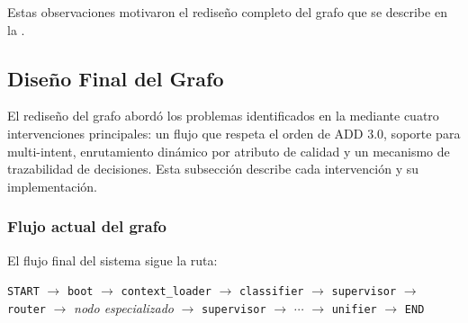 \documentclass[12pt, letterpaper, oneside]{article}
\begin{document}
Estas observaciones motivaron el rediseño completo del grafo que se describe en
la .


\subsection{Diseño Final del Grafo}
\label{subsec:grafo-final}


El rediseño del grafo abordó los problemas identificados en la
 mediante cuatro intervenciones principales: un flujo
que respeta el orden de ADD 3.0, soporte para multi-intent, enrutamiento dinámico
por atributo de calidad y un mecanismo de trazabilidad de decisiones. Esta
subsección describe cada intervención y su implementación.

\subsubsection{Flujo actual del grafo}
\label{sssec:flujo-actual}

El flujo final del sistema sigue la ruta:

\begin{center}
\texttt{START} $\rightarrow$ \texttt{boot} $\rightarrow$
\texttt{context\_loader} $\rightarrow$ \texttt{classifier}
$\rightarrow$ \texttt{supervisor} $\rightarrow$ \texttt{router}
$\rightarrow$ \emph{nodo especializado} $\rightarrow$
\texttt{supervisor} $\rightarrow$ $\cdots$ $\rightarrow$
\texttt{unifier} $\rightarrow$ \texttt{END}
\end{center}
\end{document}
